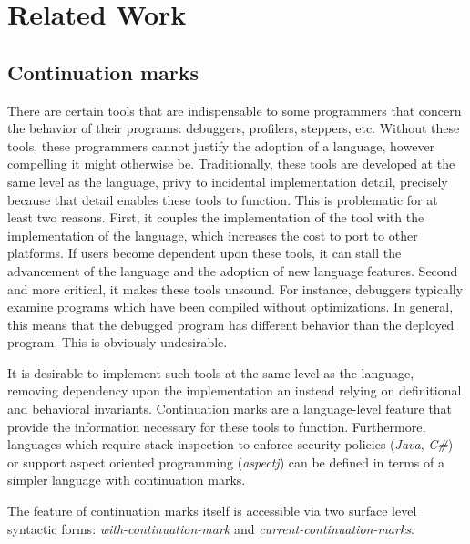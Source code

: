 \documentclass[ms]{byuprop}
\newcounter{definition}
\begin{document}

\section{Related Work}

\subsection{Continuation marks}

There are certain tools that are indispensable to some programmers that concern the
behavior of their programs: debuggers, profilers, steppers, etc. Without these tools,
these programmers cannot justify the adoption of a language, however compelling it might
otherwise be. Traditionally, these tools are developed at the same level as the 
language, privy to incidental implementation detail, precisely because that detail 
enables these tools to function. This is problematic for at least two reasons. First, 
it couples the implementation of the tool with the implementation of the language, which
increases the cost to port to other platforms. If users become dependent upon these tools,
it can stall the advancement of the language and the adoption of new language features.
Second and more critical, it makes these tools unsound. For instance, debuggers typically
examine programs which have been compiled without optimizations. In general, this means 
that the debugged program has different behavior than the deployed program. This is 
obviously undesirable.

It is desirable to implement such tools at the same level as the language, removing
dependency upon the implementation an instead relying on definitional and behavioral
invariants. Continuation marks are a language-level feature that provide the information
necessary for these tools to function. Furthermore, languages which require stack
inspection to enforce security policies (\emph{Java}, \emph{C\#}) or support aspect
oriented programming (\emph{aspectj}) can be defined in terms of a simpler language with
continuation marks.

The feature of continuation marks itself is accessible via two surface level syntactic
forms: \emph{with-continuation-mark} and \emph{current-continuation-marks}.
\end{document}
